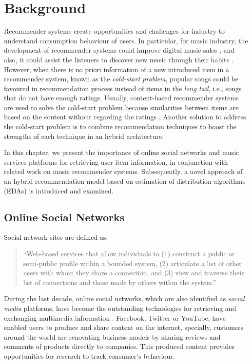 \chapter{Background}
\label{ch:background}
Recommender systems create opportunities and challenges for industry to understand consumption behaviour of users. In particular, for music industry, the development of recommender systems could improve digital music sales \parencite{ringen_2015}, and also, it could assist the listeners to discover new music through their habits \parencite{1_hypebot.com_2015}. However, when there is no priori information of a new introduced item in a recommender system, known as the \textit{cold-start problem}, popular songs could be favoured in recommendation process instead of items in the \textit{long tail}, i.e., songs that do not have enough ratings. Usually, content-based recommender systems are used to solve the cold-start problem because similarities between items are based on the content without regarding the ratings \parencite{Park200811}. Another solution to address the cold-start problem is to combine recommendation techniques to boost the strengths of each technique in an hybrid architecture. \parencite{melville2010recommender}

In this chapter, we present the importance of online social networks and music services platforms for retrieving user-item information, in conjunction with related work on music recommender systems. Subsequently, a novel approach of an hybrid recommendation model based on estimation of distribution algorithms (EDAs) is introduced and examined.

\section{Online Social Networks}
Social network sites \parencite{JCC4:JCC4393} are defined as: \begin{quote}``Web-based services that allow individuals to (1) construct a public or semi-public profile within a bounded system, (2) articulate a list of other users with whom they share a connection, and (3) view and traverse their list of connections and those made by others within the system.''\end{quote}

During the last decade, online social networks, which are also identified as \textit{social media} platforms, have become the outstanding technologies for retrieving and exchanging multimedia information \parencite{Putzke2014519}. Facebook, Twitter or YouTube, have enabled users to produce and share content on the internet, specially, customers around the world are renovating business models by sharing reviews and comments of products directly to companies. This produced content provides opportunities for research to track consumer's behaviour. \parencite{smith2009social}

